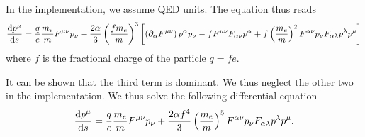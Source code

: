In the implementation, we assume QED units. The equation thus reads
  \begin{equation}
    \dv{p^\mu}{s}=\frac{q}{e}\frac{m_e}{m}F^{\mu\nu}p_\nu
                   +\frac{2\alpha}{3}\left(\frac{fm_e}{m}\right)^3
                      \left[
                        \left(\partial_\alpha F^{\mu\nu}\right)p^\alpha p_\nu
                      - fF^{\mu\nu}F_{\alpha\nu}p^\alpha
                      + f\left(\frac{m_e}{m}\right)^2 F^{\alpha\nu}p_\nu F_{\alpha\lambda}p^\lambda p^\mu
                      \right]
\end{equation}
where $f$ is the fractional charge of the particle $q=fe$.

It can be shown \cite{} that the third term is dominant. We thus neglect the other
two in the implementation. We thus solve the following differential equation
  \begin{equation}
    \dv{p^\mu}{s}=\frac{q}{e}\frac{m_e}{m}F^{\mu\nu}p_\nu
                   +\frac{2\alpha f^4}{3}\left(\frac{m_e}{m}\right)^5
                   F^{\alpha\nu}p_\nu F_{\alpha\lambda}p^\lambda p^\mu.
  \end{equation}
